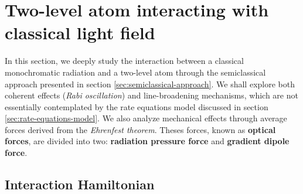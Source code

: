 %
\section{Two-level atom interacting with classical light field}
\label{sec:two-level-atom}
%

In this section, we deeply study the interaction between a classical monochromatic radiation and a two-level atom through the semiclassical approach presented in section \ref{sec:semiclassical-approach}. We shall explore both coherent effects (\textit{Rabi oscillation}) and line-broadening mechanisms, which are not essentially contemplated by the rate equations model discussed in section \ref{sec:rate-equations-model}. We also analyze mechanical effects through average forces derived from the \textit{Ehrenfest theorem}. Theses forces, known as \textbf{optical forces}, are divided into two: \textbf{radiation pressure force} and \textbf{gradient dipole force}.

\subsection{Interaction Hamiltonian}
\label{sec:interaction-Hamiltonian}

